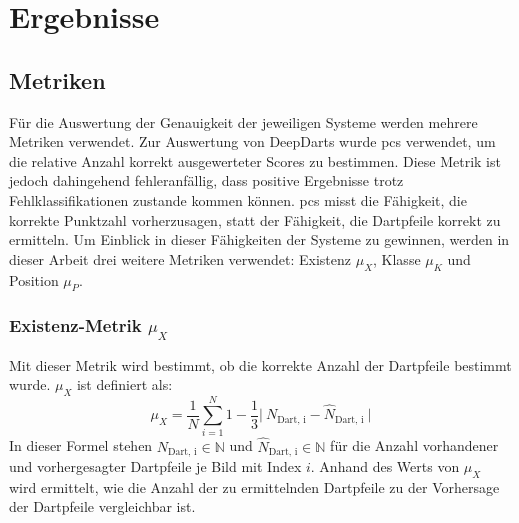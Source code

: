 
\section{Ergebnisse}
\label{sec:ki:ergebnisse}



\subsection{Metriken}
\label{sec:ki_metriken}

Für die Auswertung der Genauigkeit der jeweiligen Systeme werden mehrere Metriken verwendet. Zur Auswertung von DeepDarts wurde \ac{pcs} verwendet, um die relative Anzahl korrekt ausgewerteter Scores zu bestimmen. Diese Metrik ist jedoch dahingehend fehleranfällig, dass positive Ergebnisse trotz Fehlklassifikationen zustande kommen können. \ac{pcs} misst die Fähigkeit, die korrekte Punktzahl vorherzusagen, statt der Fähigkeit, die Dartpfeile korrekt zu ermitteln. Um Einblick in dieser Fähigkeiten der Systeme zu gewinnen, werden in dieser Arbeit drei weitere Metriken verwendet: Existenz $\mu_X$, Klasse $\mu_K$ und Position $\mu_P$.

\subsubsection{Existenz-Metrik $\mu_X$}

Mit dieser Metrik wird bestimmt, ob die korrekte Anzahl der Dartpfeile bestimmt wurde. $\mu_X$ ist definiert als:
\begin{equation*}
    \mu_X = \frac{1}{N} \sum_{i=1}^{N}1 - \frac{1}{3} \vert~N_\text{Dart, i} - \widehat{N}_\text{Dart, i}~\vert
\end{equation*}
In dieser Formel stehen $N_\text{Dart, i} \in \mathbb{N}$ und $\widehat{N}_\text{Dart, i} \in \mathbb{N}$ für die Anzahl vorhandener und vorhergesagter Dartpfeile je Bild mit Index $i$. Anhand des Werts von $\mu_X$ wird ermittelt, wie die Anzahl der zu ermittelnden Dartpfeile zu der Vorhersage der Dartpfeile vergleichbar ist.

